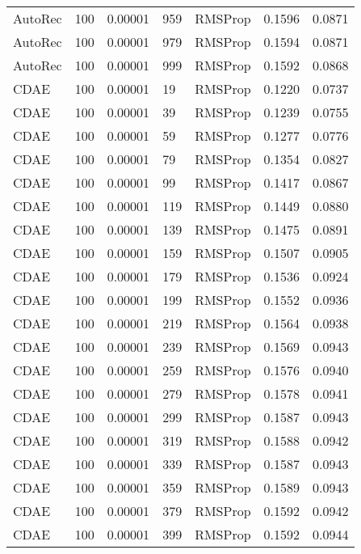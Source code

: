 \begin{tabular}{llrllrr}
 AutoRec &  100 &  0.00001 &   959 &   RMSProp &  0.1596 &       0.0871 \\
 AutoRec &  100 &  0.00001 &   979 &   RMSProp &  0.1594 &       0.0871 \\
 AutoRec &  100 &  0.00001 &   999 &   RMSProp &  0.1592 &       0.0868 \\
    CDAE &  100 &  0.00001 &    19 &   RMSProp &  0.1220 &       0.0737 \\
    CDAE &  100 &  0.00001 &    39 &   RMSProp &  0.1239 &       0.0755 \\
    CDAE &  100 &  0.00001 &    59 &   RMSProp &  0.1277 &       0.0776 \\
    CDAE &  100 &  0.00001 &    79 &   RMSProp &  0.1354 &       0.0827 \\
    CDAE &  100 &  0.00001 &    99 &   RMSProp &  0.1417 &       0.0867 \\
    CDAE &  100 &  0.00001 &   119 &   RMSProp &  0.1449 &       0.0880 \\
    CDAE &  100 &  0.00001 &   139 &   RMSProp &  0.1475 &       0.0891 \\
    CDAE &  100 &  0.00001 &   159 &   RMSProp &  0.1507 &       0.0905 \\
    CDAE &  100 &  0.00001 &   179 &   RMSProp &  0.1536 &       0.0924 \\
    CDAE &  100 &  0.00001 &   199 &   RMSProp &  0.1552 &       0.0936 \\
    CDAE &  100 &  0.00001 &   219 &   RMSProp &  0.1564 &       0.0938 \\
    CDAE &  100 &  0.00001 &   239 &   RMSProp &  0.1569 &       0.0943 \\
    CDAE &  100 &  0.00001 &   259 &   RMSProp &  0.1576 &       0.0940 \\
    CDAE &  100 &  0.00001 &   279 &   RMSProp &  0.1578 &       0.0941 \\
    CDAE &  100 &  0.00001 &   299 &   RMSProp &  0.1587 &       0.0943 \\
    CDAE &  100 &  0.00001 &   319 &   RMSProp &  0.1588 &       0.0942 \\
    CDAE &  100 &  0.00001 &   339 &   RMSProp &  0.1587 &       0.0943 \\
    CDAE &  100 &  0.00001 &   359 &   RMSProp &  0.1589 &       0.0943 \\
    CDAE &  100 &  0.00001 &   379 &   RMSProp &  0.1592 &       0.0942 \\
    CDAE &  100 &  0.00001 &   399 &   RMSProp &  0.1592 &       0.0944 \\

\end{tabular}
